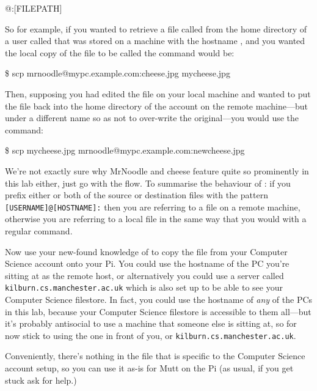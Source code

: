 \begin{ttoutenv}
[USERNAME]\!@\![HOSTNAME]:[FILEPATH]
\end{ttoutenv}

So for example, if you wanted to retrieve a file called
 from the home directory of a user called
 that was stored on a machine with the hostname
, and you wanted the local copy of the file to
be called  the command would be:

\begin{ttoutenv}
\$ scp mrnoodle@mypc.example.com:cheese.jpg mycheese.jpg
\end{ttoutenv}

Then, supposing you had edited the file  on your
local machine and wanted to put the file back into the home directory
of the  account on the remote machine---but under a
different name so as not to over-write the original---you would use
the command:

\begin{ttoutenv}
\$ scp mycheese.jpg mrnoodle@mypc.example.com:newcheese.jpg
\end{ttoutenv}

We're not exactly sure why MrNoodle and cheese feature quite so
prominently in this lab either, just go with the flow. To summarise
the behaviour of : if you prefix either or both of the
source or destination files with the pattern
\verb|[USERNAME]@[HOSTNAME]:| then you are referring to a file on a
remote machine, otherwise you are referring to a local file in the
same way that you would with a regular  command.

Now use your new-found knowledge of  to copy the
 file from your Computer Science account onto your
Pi. You could use the hostname of the PC you're sitting at as the
remote host, or alternatively you could use a server called
\texttt{kilburn.cs.manchester.ac.uk} which is also set up to be able
to see your Computer Science filestore. In fact, you could use the
hostname of \textit{any} of the PCs in this lab, because your Computer
Science filestore is accessible to them all---but it's probably
antisocial to use a machine that someone else is sitting at, so for
now stick to using the one in front of you, or
\texttt{kilburn.cs.manchester.ac.uk}.

Conveniently, there's nothing in the  file that is
specific to the Computer Science account setup, so you can use it
as-is for Mutt on the Pi (as usual, if you get stuck ask for help.)

